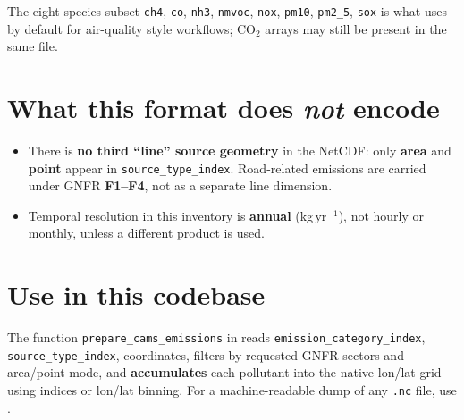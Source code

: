\documentclass[11pt,a4paper]{article}
\begin{document}
\noindent The eight-species subset \texttt{ch4}, \texttt{co}, \texttt{nh3}, \texttt{nmvoc}, \texttt{nox}, \texttt{pm10}, \texttt{pm2\_5}, \texttt{sox} is what  uses by default for air-quality style workflows; CO$_2$ arrays may still be present in the same file.

\section{What this format does \emph{not} encode}

\begin{itemize}
  \item There is \textbf{no third ``line'' source geometry} in the NetCDF: only \textbf{area} and \textbf{point} appear in \texttt{source\_type\_index}. Road-related emissions are carried under GNFR \textbf{F1--F4}, not as a separate line dimension.
  \item Temporal resolution in this inventory is \textbf{annual} (kg\,yr$^{-1}$), not hourly or monthly, unless a different product is used.
\end{itemize}

\section{Use in this codebase}

The function \texttt{prepare\_cams\_emissions} in  reads \texttt{emission\_category\_index}, \texttt{source\_type\_index}, coordinates, filters by requested GNFR sectors and area/point mode, and \textbf{accumulates} each pollutant into the native lon/lat grid using indices or lon/lat binning. For a machine-readable dump of any \texttt{.nc} file, use .
\end{document}
